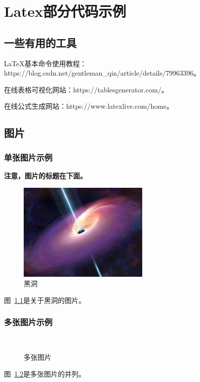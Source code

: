 \thispagestyle{main}
\chapter{Latex部分代码示例}
\thispagestyle{main}


\section{一些有用的工具}

LaTeX基本命令使用教程：https://blog.csdn.net/gentleman\_qin/article/details/79963396。

在线表格可视化网站：https://tablesgenerator.com/。

在线公式生成网站：https://www.latexlive.com/home。


\section{图片}

\subsection{单张图片示例}

\textbf{注意，图片的标题在下面。}
\begin{figure}[!ht]
    \centering
    \includegraphics[width=2.5in]{images/blackhole.jpeg}
    \caption{黑洞}
    \label{fig:blackhole}
\end{figure}
图~\ref{fig:blackhole}是关于黑洞的图片。

\subsection{多张图片示例}

\begin{figure}[!ht]
    \centering
    \hfill
    \\
    \hfill
    \caption{多张图片}
    \label{fig:example}
\end{figure}
图~\ref{fig:example}是多张图片的并列。


